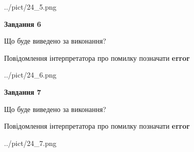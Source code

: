 \documentclass[10pt, ukrainian]{article}
\begin{document}
{\begin {large}
\begin{center}
	{../pict/24_5.png}
\end{center}
\newpage

{\begin {center}\textbf{Завдання 6}\end {center}}\par
Що буде виведено за виконання? \par
Повідомлення інтерпретатора про помилку позначати \textbf{error}

\begin{center}
	{../pict/24_6.png}
\end{center}
\newpage

{\begin {center}\textbf{Завдання 7}\end {center}}\par
Що буде виведено за виконання? \par
Повідомлення інтерпретатора про помилку позначати \textbf{error}

\begin{center}
	{../pict/24_7.png}
\end{center}
\newpage

\end {large}}
\end{document}
